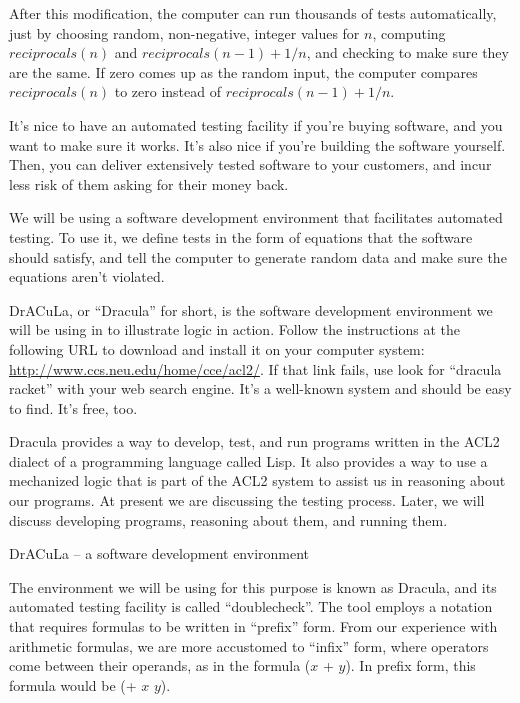 After this modification, the computer can run thousands of tests automatically,
just by choosing random, non-negative, integer values for $n$,
computing $reciprocals(n)$ and $reciprocals(n-1) + 1/n$,
and checking to make sure they are the same.
If zero comes up as the random input,
the computer compares $reciprocals(n)$ to zero instead of
$reciprocals(n-1) + 1/n$.

It's nice to have an automated testing facility if you're buying software,
and you want to make sure it works.
It's also nice if you're building the software yourself.
Then, you can deliver extensively tested software to your customers,
and incur less risk of them asking for their money back.

We will be using a software development environment that facilitates automated testing.
To use it, we define tests in the form of equations that the software should satisfy,
and tell the computer to generate random data and make sure the equations aren't violated.

\begin{aside}
DrACuLa, or ``Dracula'' for short, is the software development environment
we will be using in to illustrate logic in action.
Follow the instructions at the following URL to download and install it on your computer system:
\url{http://www.ccs.neu.edu/home/cce/acl2/}.
If that link fails, use look for ``dracula racket'' with your web search engine.
It's a well-known system and should be easy to find. It's free, too.

Dracula provides a way to develop, test, and run programs
written in the ACL2 dialect of a programming language called Lisp.
It also provides a way to use a mechanized logic that is part of the ACL2 system
to assist us in reasoning about our programs.
At present we are discussing the testing process.
Later, we will discuss developing programs, reasoning about them, and running them.

\caption{DrACuLa -- a software development environment}
\label{dracula}
\end{aside}

The environment we will be using for this purpose is known as Dracula,
and its automated testing facility is called ``doublecheck''.
The tool employs a notation that requires formulas to be written in ``prefix'' form.
From our experience with arithmetic formulas, we are more accustomed to ``infix'' form,
where operators come between their operands, as in the formula ($x$ + $y$).
In prefix form, this formula would be (+ $x$ $y$).

